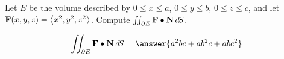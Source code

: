 \documentclass{ximera}
\author{David Guichard \and Neal Koblitz \and H. Jerome Keisler \and Albert Scheller \and Barry Balof \and Mike Wills \and Matthew Carr}
\begin{document}
\begin{exercise}




Let $E$ be the volume described by $0\le x\le a$, $0\le y\le b$, $0\le z\le c$, and let $\mathbf{F}(x,y,z)=\left\langle x^2,y^2,z^2\right\rangle$. Compute $\iint_{\partial E}\mathbf{F}\bullet\mathbf{N}\mathop{}\!d\! S$.

\begin{prompt}
\[
\iint_{\partial E}\vec{F}\dotp\vec{N}\d S=\answer{a^2 b c + ab^2 c + a b c^2}
\]
\end{prompt}


\end{exercise}
\end{document}
